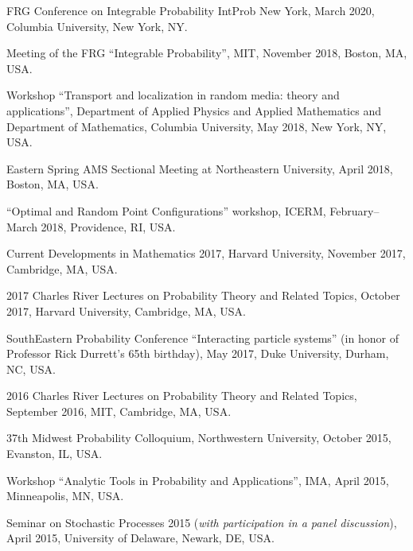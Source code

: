 \documentclass[letterpaper,11pt]{article}
\begin{document}
\begin{etaremune}
	\item
	FRG Conference on Integrable Probability IntProb New York, March 2020, Columbia University,
	New York, NY.
	\item 
	Meeting of the FRG ``Integrable Probability'', MIT, November 2018, 
	Boston, MA, USA.
	\item 
		Workshop ``Transport and localization in random media: theory and applications'',
		Department of Applied Physics and Applied Mathematics and Department of Mathematics,
		Columbia University, 
		May 2018, 
		New York, NY, USA.
	\item 
		Eastern Spring AMS Sectional Meeting at Northeastern University,
	      April 2018, Boston, MA, USA.
	\item
		``Optimal and Random Point Configurations'' workshop, ICERM, February--March 2018, Providence, RI,
	      USA.
	\item 
		Current Developments in Mathematics 2017, Harvard University, November 2017, Cambridge, MA, USA.
	\item
	      2017 Charles River Lectures on Probability Theory and Related
	      Topics, October 2017, Harvard University, Cambridge, MA, USA.
	\item
	      SouthEastern Probability Conference ``Interacting particle
	      systems'' (in honor of Professor Rick Durrett's 65th birthday), May 2017, Duke
	      University, Durham, NC, USA.

	\item
	      2016 Charles River Lectures on Probability Theory and Related
	      Topics, September 2016, MIT, Cambridge, MA, USA.


	\item
	      37th Midwest Probability Colloquium, Northwestern University,
	      October 2015, Evanston, IL, USA.

	\item
	      Workshop ``Analytic Tools in Probability and Applications'',
	      IMA, April 2015, Minneapolis, MN, USA.

	\item
	      Seminar on Stochastic Processes 2015 (\emph{with participation
		      in a panel discussion}), April 2015, University of Delaware, Newark, DE, USA.


\end{etaremune}
\end{document}

